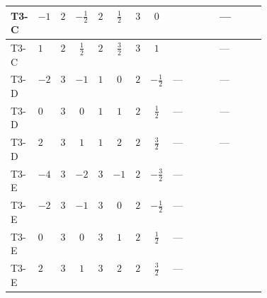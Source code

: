 \documentclass[8pt]{article}
\begin{document}
\begin{landscape}
\begin{longtable}{@{}llcccccc >{\raggedright\arraybackslash}p{0.21\linewidth} >{\raggedright\arraybackslash}p{0.21\linewidth}@{}}
\midrule
T3-C & $-1$ & $2$ & $-\frac{1}{2}$ & $2$ & $\frac{1}{2}$ & $3$ & $0$ & \scriptsize\adjustbox{max width=\linewidth}{$\begin{gathered} {\lambda_{HS_2}^{(A)}} (3 T_{\nu}^{(2)}+6 \operatorname{Tr}\!\left({Y_d}\,\left({Y_d}\right)^{\dagger}\right)+2 \operatorname{Tr}\!\left({Y_e}\,\left({Y_e}\right)^{\dagger}\right)+6 \operatorname{Tr}\!\left({Y_u}\,\left({Y_u}\right)^{\dagger}\right))\end{gathered}$} & --- \\
\midrule
T3-C & $1$ & $2$ & $\frac{1}{2}$ & $2$ & $\frac{3}{2}$ & $3$ & $1$ & \scriptsize\adjustbox{max width=\linewidth}{$\begin{gathered} {\lambda_{HS_2}^{(A)}} (3 T_{\nu}^{(2)}+6 \operatorname{Tr}\!\left({Y_d}\,\left({Y_d}\right)^{\dagger}\right)+2 \operatorname{Tr}\!\left({Y_e}\,\left({Y_e}\right)^{\dagger}\right)+6 \operatorname{Tr}\!\left({Y_u}\,\left({Y_u}\right)^{\dagger}\right))\end{gathered}$} & --- \\
\midrule
T3-D & $-2$ & $3$ & $-1$ & $1$ & $0$ & $2$ & $-\frac{1}{2}$ & --- & --- \\
\midrule
T3-D & $0$ & $3$ & $0$ & $1$ & $1$ & $2$ & $\frac{1}{2}$ & --- & --- \\
\midrule
T3-D & $2$ & $3$ & $1$ & $1$ & $2$ & $2$ & $\frac{3}{2}$ & --- & --- \\
\midrule
T3-E & $-4$ & $3$ & $-2$ & $3$ & $-1$ & $2$ & $-\frac{3}{2}$ & --- & \scriptsize\adjustbox{max width=\linewidth}{$\begin{gathered} +12 {\lambda_{12}^{(A)}} {\lambda_{HS_1}^{(A)}}\end{gathered}$} \\
\midrule
T3-E & $-2$ & $3$ & $-1$ & $3$ & $0$ & $2$ & $-\frac{1}{2}$ & --- & \scriptsize\adjustbox{max width=\linewidth}{$\begin{gathered} +12 {\lambda_{12}^{(A)}} {\lambda_{HS_1}^{(A)}}\end{gathered}$} \\
\midrule
T3-E & $0$ & $3$ & $0$ & $3$ & $1$ & $2$ & $\frac{1}{2}$ & --- & \scriptsize\adjustbox{max width=\linewidth}{$\begin{gathered} +12 {\lambda_{12}^{(A)}} {\lambda_{HS_1}^{(A)}}\end{gathered}$} \\
\midrule
T3-E & $2$ & $3$ & $1$ & $3$ & $2$ & $2$ & $\frac{3}{2}$ & --- & \scriptsize\adjustbox{max width=\linewidth}{$\begin{gathered} +12 {\lambda_{12}^{(A)}} {\lambda_{HS_1}^{(A)}}\end{gathered}$} \\
\midrule
\bottomrule
\end{longtable}
\clearpage

\end{landscape}
\end{document}
